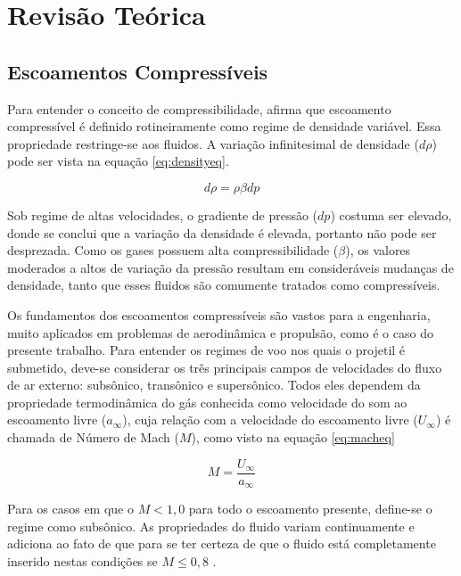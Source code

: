 \chapter{Revisão Teórica}
\graphicspath{{chapter-02/img-cap02/}}

\noindent
\section{Escoamentos Compressíveis}

Para entender o conceito de compressibilidade, \citeauthor{anderson_modern_2002} afirma que escoamento compressível é definido rotineiramente como regime de densidade variável. Essa propriedade restringe-se aos fluidos. A variação infinitesimal de densidade ($d\rho$) pode ser vista na equação \ref{eq:densityeq}. 

\begin{equation} \label{eq:densityeq}
    d\rho = \rho\beta dp
\end{equation}

Sob regime de altas velocidades, o gradiente de pressão ($dp$) costuma ser elevado, donde se conclui que a variação da densidade é elevada, portanto não pode ser desprezada. Como os gases possuem alta compressibilidade ($\beta$), os valores moderados a altos de variação da pressão resultam em consideráveis mudanças de densidade, tanto que esses fluidos são comumente tratados como compressíveis.

Os fundamentos dos escoamentos compressíveis são vastos para a engenharia, muito aplicados em problemas de aerodinâmica e propulsão, como é o caso do presente trabalho. Para entender os regimes de voo nos quais o projetil é submetido, deve-se considerar os três principais campos de velocidades do fluxo de ar externo: subsônico, transônico e supersônico. Todos eles dependem da propriedade termodinâmica do gás conhecida como velocidade do som ao escoamento livre ($a_{\infty}$), cuja relação com a velocidade do escoamento livre ($U_{\infty}$) é chamada de Número de Mach ($M$), como visto na equação \ref{eq:macheq}

\begin{equation} \label{eq:macheq}
    M = \frac{U_\infty}{a_\infty}
\end{equation}

Para os casos em que o $M < 1,0$ para todo o escoamento presente, define-se o regime como subsônico. As propriedades do fluido variam continuamente e adiciona ao fato de que para se ter certeza de que o fluido está completamente inserido nestas condições se $M \leq 0,8$ \cite{anderson_modern_2002}. 

